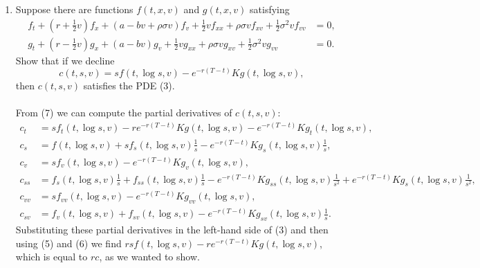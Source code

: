\documentclass[11pt,a4,table]{article}
\begin{document}
\begin{enumerate}
\begin{enumerate}
        \item  Suppose there are functions $f(t,x,v)$ and $g(t,x,v)$ satisfying
        \begin{align}
            f_t + \left(r + \frac{1}{2}v\right) f_x + (a - bv + \rho \sigma v) f_v + \frac{1}{2}vf_{xx} + \rho\sigma v f_{xv} + \frac{1}{2}\sigma^2 v f_{vv} &= 0,\\
            g_t + \left(r - \frac{1}{2}v\right) g_x + (a - bv) g_v + \frac{1}{2}vg_{xx} + \rho \sigma v g_{xv} + \frac{1}{2}\sigma^2 vg_{vv} &=0.
        \end{align}
        Show that if we decline
        \begin{equation}
            c(t,s,v) = sf(t,\log s, v) - e^{-r(T-t)}Kg(t,\log s, v),
        \end{equation}
        then $c(t,s,v)$ satisfies the PDE (3).\\\\
        From (7) we can compute the partial derivatives of $c(t,s,v)$:
        \begin{align*}
            c_t &= sf_t(t,\log s,v) - re^{-r(T-t)}Kg(t,\log s, v) - e^{-r(T-t)}Kg_t(t,\log s, v),\\
            c_s &= f(t,\log s,v) + sf_s(t,\log s,v)\frac{1}{s} - e^{-r(T-t)}Kg_s(t,\log s, v)\frac{1}{s},\\
            c_v &= sf_v(t,\log s,v) - e^{-r(T-t)}Kg_v(t,\log s, v),\\
            c_{ss} &=f_s(t,\log s,v)\frac{1}{s} + f_{ss}(t,\log s,v)\frac{1}{s} - e^{-r(T-t)}Kg_{ss}(t,\log s,v)\frac{1}{s^2} + e^{-r(T-t)}Kg_s(t,\log s,v)\frac{1}{s^2},\\
            c_{vv} &=sf_{vv}(t,\log s,v) - e^{-r(T-t)}Kg_{vv}(t,\log s,v),\\
            c_{sv} &= f_v(t,\log s,v) + f_{sv}(t,\log s,v) - e^{-r(T-t)}Kg_{sv}(t,\log s,v)\frac{1}{s}.
        \end{align*}
        Substituting these partial derivatives in the left-hand side of (3) and then using (5) and (6) we find $rsf(t,\log s,v) - re^{-r(T-t)} Kg(t,\log s,v)$, which is equal to $rc$, as we wanted to show.
        

\end{enumerate}
\end{enumerate}
\end{document}
